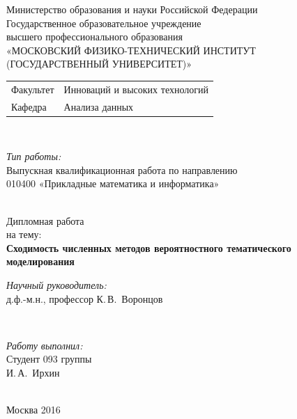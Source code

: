 \documentclass[12pt]{article}
\begin{document}
\begin{titlepage}

\begin{center}

Министерство образования и науки Российской Федерации\\[1em]
Государственное образовательное учреждение\\
высшего профессионального образования \\
«МОСКОВСКИЙ ФИЗИКО-ТЕХНИЧЕСКИЙ ИНСТИТУТ \\
(ГОСУДАРСТВЕННЫЙ УНИВЕРСИТЕТ)»\\[1em]

\begin{minipage}{\textwidth}
\begin{flushleft}
\begin{tabular}{ l l }
Факультет & Инноваций и высоких технологий\\
Кафедра & Анализа данных
\end{tabular}
\end{flushleft}
\end{minipage}\\[1em]

\begin{minipage}{\textwidth}
\begin{flushright}
\textit{Тип работы:}\\
Выпускная квалификационная работа по направлению\\
010400 «Прикладные математика и информатика»
\end{flushright}
\end{minipage}\\[3em]


{Дипломная работа}\\
{на тему:}\\[1em]
\textbf{\large Сходимость численных методов вероятностного тематического моделирования}\\[6em]

\begin{minipage}{\textwidth}
\begin{flushright}
\textit{Научный руководитель:}\\
\underline{\hspace*{2.5cm}} д.ф.-м.н., профессор К.\,В.~Воронцов
\end{flushright}
\end{minipage}\\[3em]

\begin{minipage}{\textwidth}
\begin{flushright}
\textit{Работу выполнил:}\\
Студент 093 группы\\
\underline{\hspace*{2.5cm}} И.\,А.~Ирхин
\end{flushright}
\end{minipage}\\[3em]

\vfill
{\normalsize Москва 2016}
\end{center}
\end{titlepage}
\end{document}
